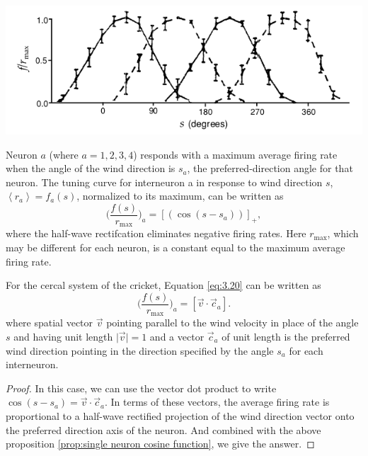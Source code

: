 \begin{center}
  \includegraphics[scale = 0.4]{./png/3-4}
\end{center}

\begin{prop}
  \label{prop:single neuron cosine function}
  Neuron $a$ (where $a=1,2,3,4$) responds
with a maximum average firing rate when the angle of the wind direction
is $s_{a}$, the preferred-direction angle for that neuron. The tuning curve for
interneuron a in response to wind direction $s$, $\left\langle r_{a}
\right\rangle=f_a(s)$, normalized to its maximum, can be written as
\begin{equation}
  \label{eq:3.20}
  \Big( \frac{f(s)}{r_{\max}} \Big)_{a}=[(\cos(s-s_a))]_+,
\end{equation}
where the half-wave rectifcation eliminates negative firing rates. Here
$r_{\max}$, which may be different for each neuron, is a constant equal to the
maximum average firing rate.
\end{prop}

\begin{prop}
 For  the cercal system of the cricket, Equation \ref{eq:3.20} can be written as
  \begin{equation}
  \label{eq:3.21}
 \Big( \frac{f(s)}{r_{\max}} \Big)_{a}=[\vec{v}\cdot\vec{c}_a].
\end{equation}
where spatial vector $\vec{v}$ pointing parallel to the wind velocity in place of the angle
$s$ and having unit length $\big| \vec{v} \big|=1$ and a vector
  $\vec{c}_{a}$  of unit length is the preferred wind direction  pointing in the
  direction specified by the angle $s_{a}$ for each interneuron.

\begin{proof}
In this case, we can use the vector dot product to write
$\cos(s-s_a)=\vec{v}\cdot\vec{c}_a$. In terms of these
vectors, the average firing rate is proportional to a half-wave
rectified projection of the wind direction vector onto the
preferred direction axis of the neuron. And combined with the above
proposition \ref{prop:single neuron cosine function}, we give the answer.
\end{proof}

\end{prop}

